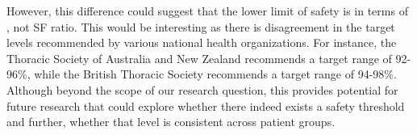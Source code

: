 However, this difference could suggest that the lower limit of safety is in terms of \Sp, not SF ratio. This would be interesting as there is disagreement in the target \Sp levels recommended by various national health organizations. For instance, the Thoracic Society of Australia and New Zealand recommends a target \Sp range of 92-96\%, while the British Thoracic Society recommends a target range of 94-98\%. Although beyond the scope of our research question, this provides potential for future research that could explore whether there indeed exists a \Sp safety threshold and further, whether that level is consistent across patient groups. 

